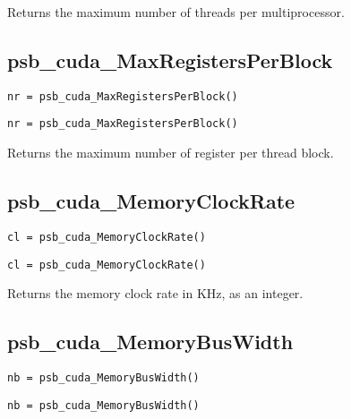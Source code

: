 Returns the maximum number of threads per multiprocessor. 


\subsection*{psb\_cuda\_MaxRegistersPerBlock }

\ifpdf
\begin{verbatim}
nr = psb_cuda_MaxRegistersPerBlock()
\end{verbatim}
\else
\begin{center}
    \begin{minipage}[tl]{0.9\textwidth}
\begin{verbatim} 
nr = psb_cuda_MaxRegistersPerBlock()
\end{verbatim}
    \end{minipage}
  \end{center}
\fi

Returns the maximum number of register per thread block. 


\subsection*{psb\_cuda\_MemoryClockRate }

\ifpdf
\begin{verbatim}
cl = psb_cuda_MemoryClockRate()
\end{verbatim}
\else
\begin{center}
    \begin{minipage}[tl]{0.9\textwidth}
\begin{verbatim} 
cl = psb_cuda_MemoryClockRate()
\end{verbatim}
    \end{minipage}
  \end{center}
\fi

Returns the memory clock rate in KHz, as an integer. 

\subsection*{psb\_cuda\_MemoryBusWidth }

\ifpdf
\begin{verbatim}
nb = psb_cuda_MemoryBusWidth()
\end{verbatim}
\else
\begin{center}
    \begin{minipage}[tl]{0.9\textwidth}
\begin{verbatim} 
nb = psb_cuda_MemoryBusWidth()
\end{verbatim}
    \end{minipage}
  \end{center}
\fi

